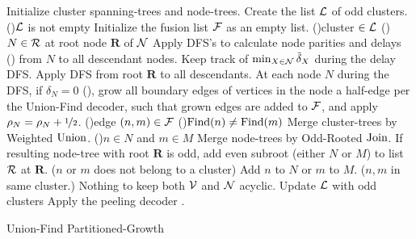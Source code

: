 \begin{algorithm}[h!]
  \BlankLine
  \BlankLine
  Initialize cluster spanning-trees and node-trees.\;\label{algo:B1a}%
  Create the list $\mathcal{L}$ of odd clusters.\;
  \While(){$\mathcal{L}$ is not empty}{
    Initialize the fusion list $\mathcal{F}$ as an empty list.\;\label{algo:B1b}
    \For(){cluster $\in\mathcal{L}$ \label{algo:B2a}}{
      \For(){$N \in\mathcal{R}$ at root node $\mathbf{R}$ of $\mathcal{N}$}{
        Apply DFS's to calculate node parities and delays () from $N$ to all descendant nodes. Keep track of $\min_{X \in \mathcal{N}}{\tilde{\delta}_X}$ during the delay DFS.\;\label{algo:pdc}
      }
      Apply DFS from root $\mathbf{R}$ to all descendants. At each node $N$ during the DFS, if $\delta_N=0$ (), grow all boundary edges of vertices in the node a half-edge per the Union-Find decoder, such that grown edges are added to $\mathcal{F}$, and apply $\rho_N=\rho_N +\nicefrac{1}{2}$. \;\label{algo:grow}
    }
    \For(){edge $(n,m) \in \mathcal{F}$\label{algo:B3a}}{
      \eIf(){$\operatorname{Find}(n)\neq\operatorname{Find}(m)$}{
        Merge cluster-trees by Weighted $\operatorname{Union}$.\;
        \eIf(){$n \in N$ and $m \in M$\label{algo:joina}}{
          Merge node-trees by Odd-Rooted $\operatorname{Join}$. If resulting node-tree with root $\mathbf{R}$ is odd, add even subroot (either $N$ or $M$) to list $\mathcal{R}$ at $\mathbf{R}$.\;
        }($n$ or $m$ does not belong to a cluster){
          Add $n$ to $N$ or $m$ to $M$.\;\label{algo:joinb}
        }
      }($n,m$ in same cluster.\label{algo:dfa}){
        Nothing to keep both $\mathcal{V}$ and $\mathcal{N}$ acyclic.\;\label{algo:dfb} 
      }
    }
    Update $\mathcal{L}$ with odd clusters\; \label{algo:B3b}
  }
  Apply the peeling decoder \cite{delfosse2017linear}.\label{algo:B4a}
  \caption{Union-Find Partitioned-Growth}\label{algo:ufbb}
\end{algorithm}